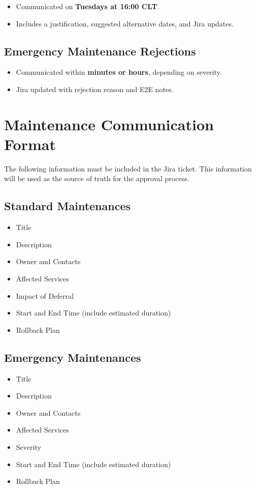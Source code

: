 \begin{itemize}[label=--]
  \item Communicated on \textbf{Tuesdays at 16:00 CLT}.
  \item Includes a justification, suggested alternative dates, and Jira updates.
\end{itemize}

\subsection{Emergency Maintenance Rejections}

\begin{itemize}[label=--]
  \item Communicated within \textbf{minutes or hours}, depending on severity.
  \item Jira updated with rejection reason and E2E notes.
\end{itemize}

\section{Maintenance Communication Format}

The following information must be included in the Jira ticket. This information will be used as the source of truth for the approval process. 

\subsection{Standard Maintenances}
\begin{itemize}[label=--]
  \item Title
  \item Description
  \item Owner and Contacts
  \item Affected Services
  \item Impact of Deferral
  \item Start and End Time (include estimated duration)
  \item Rollback Plan
\end{itemize}

\subsection{Emergency Maintenances}
\begin{itemize}[label=--]
  \item Title
  \item Description
  \item Owner and Contacts
  \item Affected Services
  \item Severity
  \item Start and End Time (include estimated duration)
  \item Rollback Plan
\end{itemize}

